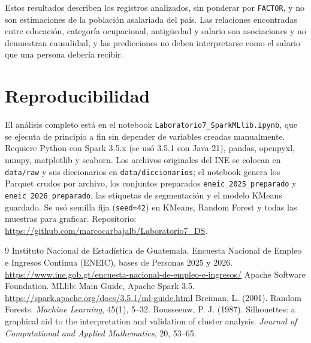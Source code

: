 \documentclass[11pt,a4paper]{article}
\newcommand{\var}[1]{\texttt{#1}}
\newcommand{\repo}{https://github.com/marcocarbajalb/Laboratorio7_DS}
\begin{document}
Estos resultados describen los registros analizados, sin ponderar por \var{FACTOR}, y no son estimaciones de la población asalariada del país. Las relaciones encontradas entre educación, categoría ocupacional, antigüedad y salario son asociaciones y no demuestran causalidad, y las predicciones no deben interpretarse como el salario que una persona debería recibir.

\section*{Reproducibilidad}

El análisis completo está en el notebook \texttt{Laboratorio7\_SparkMLlib.ipynb}, que se ejecuta de principio a fin sin depender de variables creadas manualmente. Requiere Python con Spark 3.5.x (se usó 3.5.1 con Java 21), pandas, openpyxl, numpy, matplotlib y seaborn. Los archivos originales del INE se colocan en \texttt{data/raw} y sus diccionarios en \texttt{data/diccionarios}; el notebook genera los Parquet crudos por archivo, los conjuntos preparados \texttt{eneic\_2025\_preparado} y \texttt{eneic\_2026\_preparado}, las etiquetas de segmentación y el modelo KMeans guardado. Se usó semilla fija (\texttt{seed=42}) en KMeans, Random Forest y todas las muestras para graficar. Repositorio: \url{\repo}.

\begin{thebibliography}{9}
 Instituto Nacional de Estadística de Guatemala. Encuesta Nacional de Empleo e Ingresos Continua (ENEIC), bases de Personas 2025 y 2026. \url{https://www.ine.gob.gt/encuesta-nacional-de-empleo-e-ingresos/}
 Apache Software Foundation. MLlib: Main Guide, Apache Spark 3.5. \url{https://spark.apache.org/docs/3.5.1/ml-guide.html}
 Breiman, L. (2001). Random Forests. \textit{Machine Learning}, 45(1), 5--32.
 Rousseeuw, P. J. (1987). Silhouettes: a graphical aid to the interpretation and validation of cluster analysis. \textit{Journal of Computational and Applied Mathematics}, 20, 53--65.
\end{thebibliography}
\end{document}

